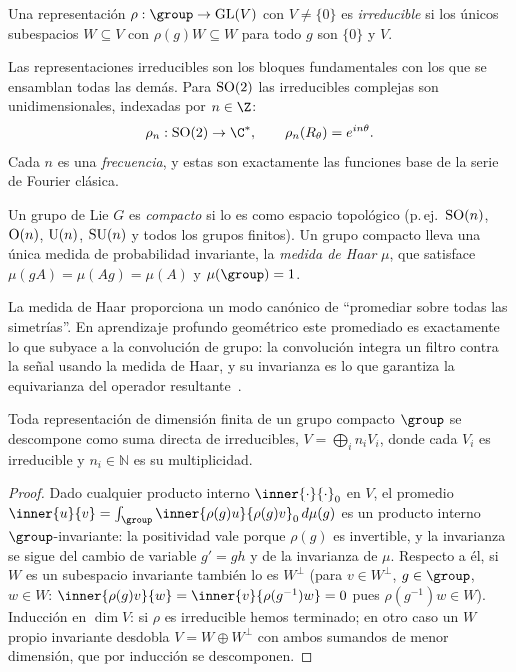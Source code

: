 \begin{definition}
\label{def:found:irreducible}
Una representaci\'on $\rho : \group \to \GL(V)$ con $V \ne \{0\}$ es
\emph{irreducible} si los \'unicos subespacios $W \subseteq V$ con $\rho(g)W
\subseteq W$ para todo $g$ son $\{0\}$ y $V$.
\end{definition}

Las representaciones irreducibles son los bloques fundamentales con los que se
ensamblan todas las dem\'as. Para $\operatorname{SO}(2)$ las irreducibles complejas son
unidimensionales, indexadas por $n \in \Z$:
\[
  \rho_n : \SO(2) \to \C^*, \qquad \rho_n(R_\theta) = e^{i n\theta}.
\]
Cada $n$ es una \emph{frecuencia}, y estas son exactamente las funciones base de la
serie de Fourier cl\'asica.

\begin{definition}
\label{def:found:haar}
Un grupo de Lie $G$ es \emph{compacto} si lo es como espacio topol\'ogico (p.\,ej.\
$\operatorname{SO}(n)$, $\operatorname{O}(n)$, $\operatorname{U}(n)$, $\operatorname{SU}(n)$ y todos los grupos finitos). Un grupo
compacto lleva una \'unica medida de probabilidad invariante, la \emph{medida de
Haar} $\mu$, que satisface $\mu(gA) = \mu(Ag) = \mu(A)$ y $\mu(\group) = 1$.
\end{definition}

La medida de Haar proporciona un modo can\'onico de ``promediar sobre todas las
simetr\'ias''. En aprendizaje profundo geom\'etrico este promediado es exactamente
lo que subyace a la convoluci\'on de grupo: la convoluci\'on integra un filtro
contra la se\~nal usando la medida de Haar, y su invarianza es lo que garantiza la
equivarianza del operador resultante~\citep{cohen2016group}.

\begin{theorem}
\label{thm:found:decomposition}
Toda representaci\'on de dimensi\'on finita de un grupo compacto $\group$ se
descompone como suma directa de irreducibles, $V = \bigoplus_i n_i V_i$, donde cada
$V_i$ es irreducible y $n_i \in \mathbb{N}$ es su multiplicidad.
\end{theorem}

\begin{proof}
Dado cualquier producto interno $\inner{\cdot}{\cdot}_0$ en $V$, el promedio
$\inner{u}{v} = \int_\group \inner{\rho(g)u}{\rho(g)v}_0\, d\mu(g)$ es un producto
interno $\group$-invariante: la positividad vale porque $\rho(g)$ es invertible, y
la invarianza se sigue del cambio de variable $g' = gh$ y de la invarianza de
$\mu$. Respecto a \'el, si $W$ es un subespacio invariante tambi\'en lo es
$W^\perp$ (para $v \in W^\perp$, $g \in \group$, $w \in W$: $\inner{\rho(g)v}{w} =
\inner{v}{\rho(g^{-1})w} = 0$ pues $\rho(g^{-1})w \in W$). Inducci\'on en $\dim V$:
si $\rho$ es irreducible hemos terminado; en otro caso un $W$ propio invariante
desdobla $V = W \oplus W^\perp$ con ambos sumandos de menor dimensi\'on, que por
inducci\'on se descomponen.
\end{proof}

